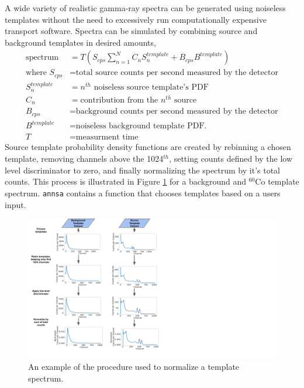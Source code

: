 A wide variety of realistic gamma-ray spectra can be generated using noiseless templates without the need to excessively run computationally expensive transport software. Spectra can be simulated by combining source and background templates in desired amounts,
%
\begin{align}
\text{spectrum} &= T ( S_{cps} \sum_{n=1}^{N} C_n S_{n}^{template}  + B_{cps} B^{template} ) \\
\text{where } S_{cps} &= \text{total source counts per second measured by the detector} \nonumber \\
S_{n}^{template} &= n^{th} \text{ noiseless source template's PDF} \nonumber \\
C_{n} &= \text{contribution from the $n^{th}$ source} \nonumber \\
B_{cps} &= \text{background counts per second measured by the detector} \nonumber \\
B^{template} &= \text{noiseless background template PDF.} \nonumber \\
T &= \text{measurment time}
\end{align}
%
Source template probability density functions are created by rebinning a chosen template, removing channels above the 1024$^{th}$, setting counts defined by the low level discriminator to zero, and finally normalizing the spectrum by it's total counts. This process is illustrated in Figure \ref{fig:template_manipulation} for a background and $^{60}$Co template spectrum. \verb|annsa| contains a function that chooses templates based on a users input.

\begin{figure}[H]
	\centering
	\includegraphics[trim=0 0 450 0,clip,width=1.0\linewidth]{images/template_manipulation.png}
	\caption{An example of the procedure used to normalize a template spectrum.}
	\label{fig:template_manipulation}
\end{figure}


